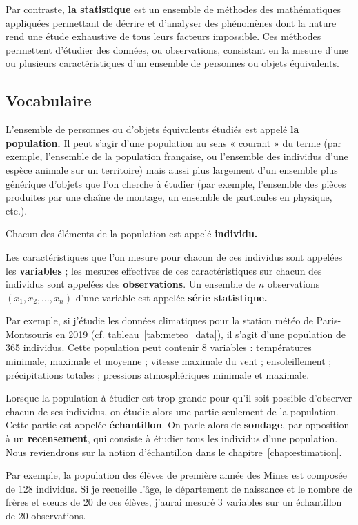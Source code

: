 Par contraste, \textbf{la statistique} est un ensemble de méthodes des
mathématiques appliquées permettant de décrire et d'analyser des phénomènes
dont la nature rend une étude exhaustive de tous leurs facteurs impossible. Ces
méthodes permettent d'étudier des données, ou observations, consistant en la
mesure d'une ou plusieurs caractéristiques d'un ensemble de personnes ou objets
équivalents.

\subsection{Vocabulaire}

L'ensemble de personnes ou d'objets équivalents étudiés est appelé \textbf{la
  population.} Il peut s'agir d'une population au sens « courant » du terme
(par exemple, l'ensemble de la population française, ou l'ensemble des
individus d'une espèce animale sur un territoire) mais aussi plus largement
d'un ensemble plus générique d'objets que l'on cherche à étudier (par exemple,
l'ensemble des pièces produites par une chaîne de montage, un ensemble de
particules en physique, etc.).

Chacun des éléments de la population est appelé \textbf{individu.} 

Les caractéristiques que l'on mesure pour chacun de ces individus sont appelées
les \textbf{variables} ; les mesures effectives de ces caractéristiques sur chacun des individus sont appelées des \textbf{observations}. Un ensemble de $n$
observations $(x_1, x_2, \dots, x_n)$ d'une variable est appelée \textbf{série
  statistique.}

Par exemple, si j'étudie les données climatiques pour la station météo de
Paris-Montsouris en 2019 (cf. tableau~\ref{tab:meteo_data}), il s'agit d'une
population de 365 individus. Cette population peut contenir 8 variables :
températures minimale, maximale et moyenne ; vitesse maximale du vent ;
ensoleillement ; précipitations totales ; pressions atmosphériques minimale et
maximale.


Lorsque la population à étudier est trop grande pour qu'il soit possible
d'observer chacun de ses individus, on étudie alors une partie seulement de la
population. Cette partie est appelée \textbf{échantillon}. On parle alors de
\textbf{sondage}, par opposition à un \textbf{recensement}, qui consiste à
étudier tous les individus d'une population. Nous reviendrons sur la notion
d'échantillon dans le chapitre~\ref{chap:estimation}.

Par exemple, la population des élèves de première année des Mines est
composée de 128 individus. Si je recueille l'âge, le département de naissance
et le nombre de frères et s\oe{}urs de 20 de ces élèves, j'aurai mesuré 3 variables
sur un échantillon de 20 observations. 

